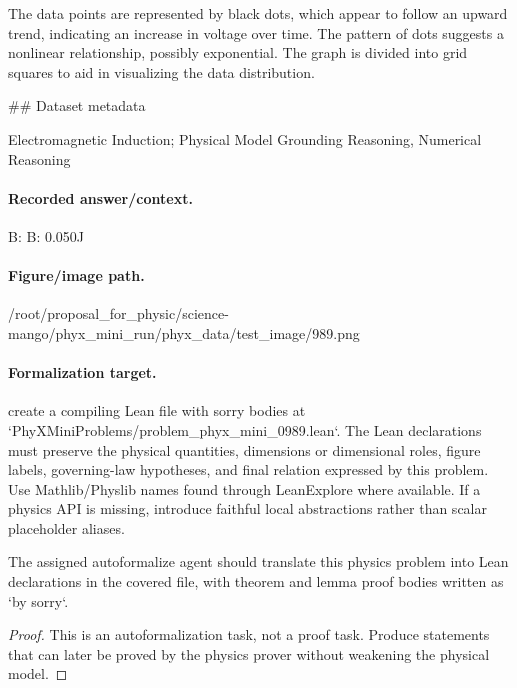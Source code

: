 The data points are represented by black dots, which appear to follow an upward trend, indicating an increase in voltage over time. The pattern of dots suggests a nonlinear relationship, possibly exponential. The graph is divided into grid squares to aid in visualizing the data distribution.

\#\# Dataset metadata

Electromagnetic Induction; Physical Model Grounding Reasoning, Numerical Reasoning

\paragraph{Recorded answer/context.}
B: B: 0.050J

\paragraph{Figure/image path.}
/root/proposal\_for\_physic/science-mango/phyx\_mini\_run/phyx\_data/test\_image/989.png

\paragraph{Formalization target.}
create a compiling Lean file with sorry bodies at `PhyXMiniProblems/problem\_phyx\_mini\_0989.lean`. The Lean declarations must preserve the physical quantities, dimensions or dimensional roles, figure labels, governing-law hypotheses, and final relation expressed by this problem.
Use Mathlib/Physlib names found through LeanExplore where available. If a physics API is missing, introduce faithful local abstractions rather than scalar placeholder aliases.

\begin{theorem}
\label{thm:physics:phyx_mini_0989:target}
The assigned autoformalize agent should translate this physics problem into Lean declarations in the covered file, with theorem and lemma proof bodies written as `by sorry`.
\end{theorem}
\begin{proof}
This is an autoformalization task, not a proof task. Produce statements that can later be proved by the physics prover without weakening the physical model.
\end{proof}

